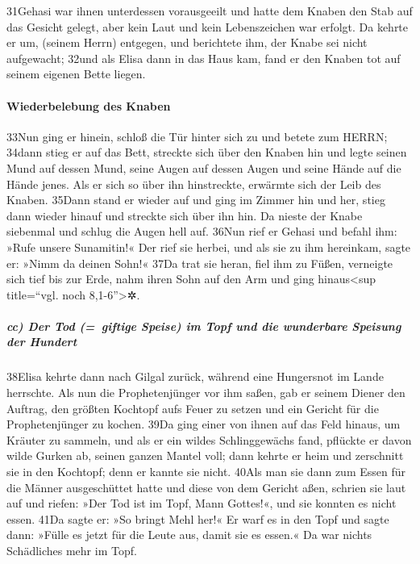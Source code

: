 31Gehasi war ihnen unterdessen vorausgeeilt und hatte dem Knaben den
Stab auf das Gesicht gelegt, aber kein Laut und kein Lebenszeichen war
erfolgt. Da kehrte er um, (seinem Herrn) entgegen, und berichtete ihm,
der Knabe sei nicht aufgewacht; 32und als Elisa dann in das Haus kam,
fand er den Knaben tot auf seinem eigenen Bette liegen.

\hypertarget{wiederbelebung-des-knaben}{%
\paragraph{Wiederbelebung des Knaben}\label{wiederbelebung-des-knaben}}

33Nun ging er hinein, schloß die Tür hinter sich zu und betete zum
HERRN; 34dann stieg er auf das Bett, streckte sich über den Knaben hin
und legte seinen Mund auf dessen Mund, seine Augen auf dessen Augen und
seine Hände auf die Hände jenes. Als er sich so über ihn hinstreckte,
erwärmte sich der Leib des Knaben. 35Dann stand er wieder auf und ging
im Zimmer hin und her, stieg dann wieder hinauf und streckte sich über
ihn hin. Da nieste der Knabe siebenmal und schlug die Augen hell auf.
36Nun rief er Gehasi und befahl ihm: »Rufe unsere Sunamitin!« Der rief
sie herbei, und als sie zu ihm hereinkam, sagte er: »Nimm da deinen
Sohn!« 37Da trat sie heran, fiel ihm zu Füßen, verneigte sich tief bis
zur Erde, nahm ihren Sohn auf den Arm und ging hinaus\textless sup
title=``vgl. noch 8,1-6''\textgreater✲.

\hypertarget{cc-der-tod-giftige-speise-im-topf-und-die-wunderbare-speisung-der-hundert}{%
\subparagraph{cc) Der Tod (=~giftige Speise) im Topf und die wunderbare
Speisung der
Hundert}\label{cc-der-tod-giftige-speise-im-topf-und-die-wunderbare-speisung-der-hundert}}

38Elisa kehrte dann nach Gilgal zurück, während eine Hungersnot im Lande
herrschte. Als nun die Prophetenjünger vor ihm saßen, gab er seinem
Diener den Auftrag, den größten Kochtopf aufs Feuer zu setzen und ein
Gericht für die Prophetenjünger zu kochen. 39Da ging einer von ihnen auf
das Feld hinaus, um Kräuter zu sammeln, und als er ein wildes
Schlinggewächs fand, pflückte er davon wilde Gurken ab, seinen ganzen
Mantel voll; dann kehrte er heim und zerschnitt sie in den Kochtopf;
denn er kannte sie nicht. 40Als man sie dann zum Essen für die Männer
ausgeschüttet hatte und diese von dem Gericht aßen, schrien sie laut auf
und riefen: »Der Tod ist im Topf, Mann Gottes!«, und sie konnten es
nicht essen. 41Da sagte er: »So bringt Mehl her!« Er warf es in den Topf
und sagte dann: »Fülle es jetzt für die Leute aus, damit sie es essen.«
Da war nichts Schädliches mehr im Topf.

